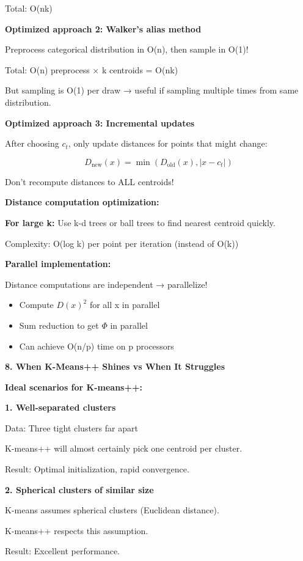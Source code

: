 \documentclass[12pt]{article}
\begin{document}
\begin{explanation}
Total: O(nk)

\textbf{Optimized approach 2: Walker's alias method}

Preprocess categorical distribution in O(n), then sample in O(1)!

Total: O(n) preprocess × k centroids = O(nk)

But sampling is O(1) per draw → useful if sampling multiple times from same distribution.

\textbf{Optimized approach 3: Incremental updates}

After choosing $c_t$, only update distances for points that might change:

\[
D_{\text{new}}(x) = \min(D_{\text{old}}(x), |x - c_t|)
\]

Don't recompute distances to ALL centroids!

\textbf{Distance computation optimization:}

\textbf{For large k:} Use k-d trees or ball trees to find nearest centroid quickly.

Complexity: O(log k) per point per iteration (instead of O(k))

\textbf{Parallel implementation:}

Distance computations are independent → parallelize!

\begin{itemize}
    \item Compute $D(x)^2$ for all x in parallel
    \item Sum reduction to get $\Phi$ in parallel
    \item Can achieve O(n/p) time on p processors
\end{itemize}

\textbf{8. When K-Means++ Shines vs When It Struggles}

\textbf{Ideal scenarios for K-means++:}

\textbf{1. Well-separated clusters}

Data: Three tight clusters far apart

K-means++ will almost certainly pick one centroid per cluster.

Result: Optimal initialization, rapid convergence.

\textbf{2. Spherical clusters of similar size}

K-means assumes spherical clusters (Euclidean distance).

K-means++ respects this assumption.

Result: Excellent performance.


\end{explanation}
\end{document}
